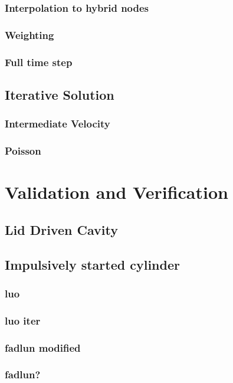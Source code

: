 \documentclass[onehalf,11pt]{beavtex}
\begin{document}
\subsection{Interpolation to hybrid nodes}
\subsection{Weighting}
\subsection{Full time step}
\section{Iterative Solution}\label{ID:Iterative}
\subsection{Intermediate Velocity}\label{ID:Iterative Intermediate Velocity}
\subsection{Poisson}\label{ID:Iterative Poisson}


\chapter{Validation and Verification}\label{Validation}
\section{Lid Driven Cavity}
\section{Impulsively started cylinder}
\subsection{luo}
\subsection{luo iter}
\subsection{fadlun modified}
\subsection{fadlun?}
\end{document}
